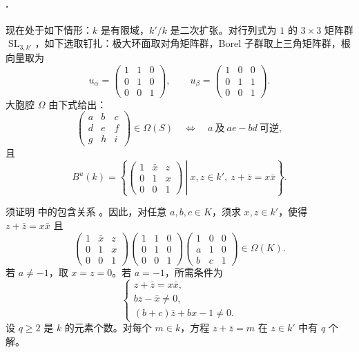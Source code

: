 \paragraph{.}
现在处于如下情形：\(k\) 是有限域，\(k'/k\) 是二次扩张。对行列式为 \(1\) 的 \(3\times3\) 矩阵群 \(\operatorname{SL}_{3,k'}\)，如下选取钉扎：极大环面取对角矩阵群，Borel 子群取上三角矩阵群，根向量取为
\[
 u_\alpha=
 \begin{pmatrix}1&1&0\\0&1&0\\0&0&1\end{pmatrix},
 \qquad
 u_\beta=
 \begin{pmatrix}1&0&0\\0&1&1\\0&0&1\end{pmatrix}.
\]
大胞腔 \(\Omega\) 由下式给出：
\[
 \begin{pmatrix}a&b&c\\d&e&f\\g&h&i\end{pmatrix}
 \in\Omega(S)
 \quad\Longleftrightarrow\quad
 a\ \text{及}\ ae-bd\ \text{可逆},
\]
且
\[
 B^u(k)=
 \left\{
 \left.
 \begin{pmatrix}1&\bar x&z\\0&1&x\\0&0&1\end{pmatrix}
 \ \right|\
 x,z\in k',\ z+\bar z=x\bar x
 \right\}.
\]

须证明  中的包含关系 \textup{}。因此，对任意 \(a,b,c\in K\)，须求 \(x,z\in k'\)，使得 \(z+\bar z=x\bar x\) 且
\[
 \begin{pmatrix}1&\bar x&z\\0&1&x\\0&0&1\end{pmatrix}
 \begin{pmatrix}1&1&0\\0&1&0\\0&0&1\end{pmatrix}
 \begin{pmatrix}1&0&0\\a&1&0\\b&c&1\end{pmatrix}
 \in\Omega(K).                                         \tag{3}\label{sga3:xxvi:theorem:5-1:equation:3}
\]
若 \(a\ne-1\)，取 \(x=z=0\)。若 \(a=-1\)，所需条件为
\[
 \begin{cases}
 z+\bar z=x\bar x,\\
 bz-\bar x\ne0,\\
 (b+c)\bar z+bx-1\ne0.
 \end{cases}                                           \tag{4}\label{sga3:xxvi:theorem:5-1:equation:4}
\]
设 \(q\geq2\) 是 \(k\) 的元素个数。对每个 \(m\in k\)，方程 \(z+\bar z=m\) 在 \(z\in k'\) 中有 \(q\) 个解。

